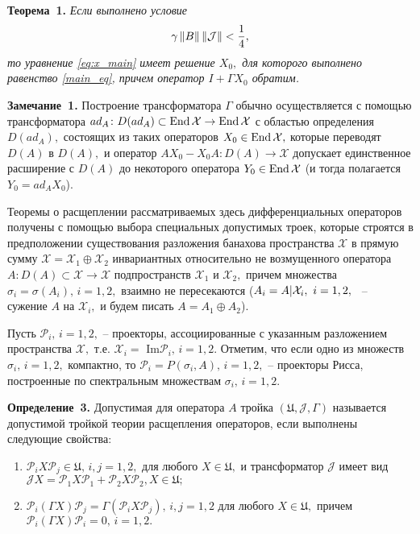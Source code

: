 \textbf{Теорема~1.}
{ \it Если выполнено условие 
\begin{equation}
 \gamma \left\|B\right\| \left\|\mathcal{J}\right\| < \frac{1}{4},
 \label{cond_normB_normJ}
\end{equation}
то уравнение \eqref{eq:x_main} имеет решение $X_0,$ для которого выполнено равенство \eqref{main_eq}, причем оператор $I + \Gamma X_0$ обратим.
}

\textbf{Замечание~1.}
Построение трансформатора $\Gamma$ обычно осуществляется с помощью трансформатора $ad_A \colon D(ad_A) \subset \operatorname{End} \mathcal{X} \to \operatorname{End} \mathcal{X}$ с областью определения $D(ad_A),$ состоящих из таких операторов  $X_0 \in \operatorname{End} \mathcal{X},$ которые переводят $D(A)$ в $D(A),$ и оператор $AX_0 - X_0A \colon D(A) \to \mathcal{X}$ допускает единственное расширение с $D(A)$ до некоторого оператора $Y_0 \in \operatorname{End} \mathcal{X}$ (и тогда полагается $Y_0 = ad_A X_0$).

Теоремы о расщеплении рассматриваемых здесь дифференциальных операторов получены с помощью выбора специальных допустимых троек, которые строятся в предположении существования разложения банахова пространства $\mathcal{X}$ в прямую сумму $\mathcal{X} = \mathcal{X}_1 \oplus \mathcal{X}_2$ инвариантных относительно не возмущенного оператора $A \colon D(A) \subset \mathcal{X} \to \mathcal{X}$ подпространств $\mathcal{X}_1$ и $\mathcal{X}_2,$ причем множества $\sigma_i = \sigma(A_i), \, i = 1,2,$ взаимно не пересекаются (${A_i = A|\mathcal{X}_i,} \enskip {i = 1,2,}$~ --~ сужение $A$ на $\mathcal{X}_i,$ и будем писать $A = A_1 \oplus A_2$).

Пусть $\mathcal{P}_i, \, i = 1,2,$ -- проекторы, ассоциированные с указанным разложением пространства $\mathcal{X},$ т.е. $\mathcal{X}_i =$ Im$\mathcal{P}_i, \, i = 1,2.$ Отметим, что если одно из множеств $\sigma_i, \, i = 1,2,$ компактно, то $\mathcal{P}_i = P(\sigma_i, A), \, i = 1,2,$ -- проекторы Рисса, построенные по спектральным множествам $\sigma_i, \, i = 1,2.$

\textbf{Определение~3.}
Допустимая для оператора $A$ тройка $(\mathfrak{U}, \mathcal{J}, \Gamma)$ называется допустимой тройкой теории расщепления операторов, если выполнены следующие свойства:
\begin{enumerate}
\item $\mathcal{P}_i X \mathcal{P}_j \in \mathfrak{U}, \, i,j = 1,2,$ для любого $X \in \mathfrak{U},$ и трансформатор $\mathcal{J}$ имеет вид $\mathcal{J}X = \mathcal{P}_1 X \mathcal{P}_1 + \mathcal{P}_2 X \mathcal{P}_2, X \in \mathfrak{U};$
\item $\mathcal{P}_i (\Gamma X)\mathcal{P}_j = \Gamma (\mathcal{P}_i X \mathcal{P}_j), \, i,j = 1,2$ для любого $X \in \mathfrak{U},$ причем \linebreak $\mathcal{P}_i (\Gamma X)\mathcal{P}_i = 0, \, i = 1,2.$ 
\end{enumerate}

